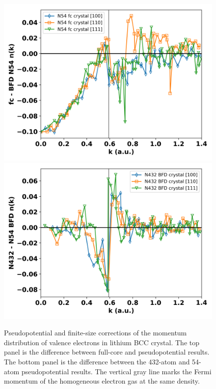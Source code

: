 \documentclass[aps,prb,showpacs,preprintnumbers,amsmath,amssymb,superscriptaddress,twocolumn]{revtex4}
\begin{document}
\begin{figure}
\includegraphics[scale=0.45]{figures/li40_bfd3-dnk-ppc}
\includegraphics[scale=0.45]{figures/li40_bfd3-dnk-fsc}
\caption{Pseudopotential and finite-size corrections of the momentum distribution of valence electrons in lithium BCC crystal. The top panel is the difference between full-core and pseudopotential results. The bottom panel is the difference between the 432-atom and 54-atom pseudopotential results. The vertical gray line marks the Fermi momentum of the homogeneous electron gas at the same density.\label{fig:dnk}}
\end{figure}
\end{document}
